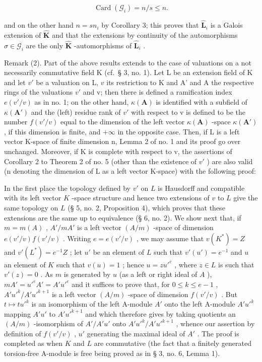 \[
\operatorname{Card} \left(\mathcal {G} _ {i}\right) = n / s \leqslant n.
\]

and on the other hand \(n = sn_{i}\) by Corollary 3; this proves that \(\hat{\mathbf{L}}_{i}\) is a Galois extension of \(\hat{\mathbf{K}}\) and that the extensions by continuity of the automorphisms \(\sigma \in \mathcal{G}_{i}\) are the only \(\hat{\mathbf{K}}\) -automorphisms of \(\hat{\mathbf{L}}_{i}\) .

Remark (2). Part of the above results extends to the case of valuations on a not necessarily commutative field K (cf.~§ 3, no. 1). Let L be an extension field of K and let \(v'\) be a valuation on L, \(v\) its restriction to K and A' and A the respective rings of the valuations \(v'\) and v; then there is defined a ramification index \(e(v'/v)\) as in no. 1; on the other hand, \(\kappa(\mathbf{A})\) is identified with a subfield of \(\kappa(\mathbf{A}')\) and the (left) residue rank of \(v'\) with respect to v is defined to be the number \(f(v'/v)\) equal to the dimension of the left vector \(\kappa(\mathbf{A})\) -space \(\kappa(\mathbf{A}')\) , if this dimension is finite, and \(+\infty\) in the opposite case. Then, if L is a left vector K-space of finite dimension n, Lemma 2 of no. 1 and its proof go over unchanged. Moreover, if K is complete with respect to v, the assertions of Corollary 2 to Theorem 2 of no. 5 (other than the existence of \(v'\) ) are also valid (n denoting the dimension of L as a left vector K-space) with the following proof:

In the first place the topology defined by \(v'\) on \(L\) is Hausdorff and compatible with its left vector \(K\) -space structure and hence two extensions of \(v\) to \(L\) give the same topology on \(L\) (§ 5, no. 2, Proposition 4), which proves that these extensions are the same up to equivalence (§ 6, no. 2). We show next that, if \(m = m(A)\) , \(A'/mA'\) is a left vector \((A/m)\) -space of dimension \(e(v'/v)f(v'/v)\) . Writing \(e = e(v'/v)\) , we may assume that \(v(K^*) = Z\) and \(v'(L^*) = e^{-1}Z\) ; let \(u'\) be an element of \(L\) such that \(v'(u') = e^{-1}\) and \(u\) an element of \(K\) such that \(v(u) = 1\) ; hence \(u = zu'^e\) , where \(z \in L\) is such that \(v'(z) = 0\) . As \(m\) is generated by \(u\) (as a left or right ideal of \(A\) ), \(mA' = u'^eA' = A'u'^e\) and it suffices to prove that, for \(0 \leqslant k \leqslant e - 1\) , \(A'u'^k/A'u'^{k+1}\) is a left vector \((A/m)\) -space of dimension \(f(v'/v)\) . But \(t \mapsto tu'^k\) is an isomorphism of the left A-module \(A'\) onto the left A-module \(A'u'^k\) mapping \(A'u'\) to \(A'u'^{k+1}\) and which therefore gives by taking quotients an \((A/m)\) -isomorphism of \(A'/A'u'\) onto \(A'u'^k/A'u'^{k+1}\) , whence our assertion by definition of \(f(v'/v)\) , \(u'\) generating the maximal ideal of \(A'\) . The proof is completed as when \(K\) and \(L\) are commutative (the fact that a finitely generated torsion-free A-module is free being proved as in § 3, no. 6, Lemma 1).

